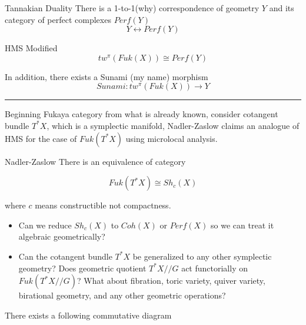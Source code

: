 \documentclass{article}
\begin{document}
\begin{proposition}{Tannakian Duality}{}
There is a 1-to-1(why) correspondence of geometry $Y$ and its category of perfect complexes $Perf(Y)$ \\
\[Y\leftrightarrow Perf(Y)\]
\end{proposition}


\begin{conjecture}{HMS Modified}{}
\[tw^\pi(Fuk(X))\cong Perf(Y)\]

In addition, there exists a Sunami (my name) morphism\\

\[
Sunami : tw^\pi(Fuk(X))\to Y
\]
\end{conjecture}


\vspace{0.5cm}
\noindent\rule{\textwidth}{0.4pt}
\vspace{0.5cm}

\noindent
Beginning Fukaya category from what is already known, consider cotangent bundle $T^*X$, which is a symplectic manifold,
Nadler-Zaslow claims an analogue of HMS for the case of $Fuk(T^*X)$ using microlocal analysis.

\begin{proposition}{Nadler-Zaslow}{}
There is an equivalence of category 

\[Fuk(T^*X) \cong Sh_c(X)\]

where $c$ means constructible not compactness.
\end{proposition}


\begin{question}{}{}
\begin{itemize}
\item Can we reduce $Sh_c(X)$ to $Coh(X)$ or $Perf(X)$ so we can treat it algebraic geometrically?
\item Can the cotangent bundle $T^*X$ be generalized to any other symplectic geometry?
Does geometric quotient $T^*X//G$ act functorially on $Fuk(T^*X//G)$?
What about fibration, toric variety, quiver variety, birational geometry, and any other geometric operations?
\end{itemize}
\end{question}


\begin{conjecture}{}{}
There exists a following commutative diagram \\
\end{conjecture}
\end{document}
